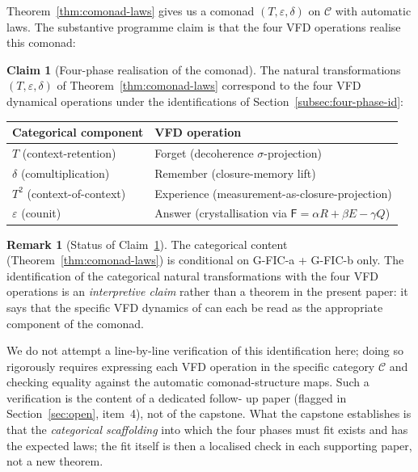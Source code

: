 \documentclass[11pt, a4paper]{amsart}
\theoremstyle{definition}
\newtheorem{remark}[theorem]{Remark}
\newtheorem{claim}[theorem]{Claim}
\newcommand{\catC}{\mathcal{C}}
\newcommand{\Fcrystal}{\mathsf{F}}
\begin{document}
Theorem~\ref{thm:comonad-laws} gives us a comonad $(T,
\varepsilon, \delta)$ on $\catC$ with automatic laws. The
substantive programme claim is that the four VFD operations
realise this comonad:

\begin{claim}[Four-phase realisation of the comonad]
\label{claim:four-phase-realisation}
The natural transformations
$(T, \varepsilon, \delta)$ of Theorem~\ref{thm:comonad-laws}
correspond to the four VFD dynamical operations under the
identifications of Section~\ref{subsec:four-phase-id}:
\begin{center}
\begin{tabular}{l|l}
Categorical component & VFD operation \\ \hline
$T$ (context-retention) & Forget (decoherence $\sigma$-projection) \\
$\delta$ (comultiplication) & Remember (closure-memory lift) \\
$T^2$ (context-of-context) & Experience (measurement-as-closure-projection) \\
$\varepsilon$ (counit) & Answer (crystallisation via
$\Fcrystal = \alpha R + \beta E - \gamma Q$) \\
\end{tabular}
\end{center}
\end{claim}

\begin{remark}[Status of Claim~\ref{claim:four-phase-realisation}]
\label{rmk:realisation-status}
The categorical content (Theorem~\ref{thm:comonad-laws}) is
conditional on G-FIC-a + G-FIC-b only. The identification of
the categorical natural transformations with the four VFD
operations is an \emph{interpretive claim} rather than a
theorem in the present paper: it says that the specific VFD
dynamics of \cite{PaperXXI, PaperXXXI, PaperXXXIII, PaperXLIV,
ACT-L1, VFDCrystallisation} can each be read as the appropriate
component of the comonad.

We do not attempt a line-by-line verification of this
identification here; doing so rigorously requires
expressing each VFD operation in the specific category $\catC$
and checking equality against the automatic comonad-structure
maps. Such a verification is the content of a dedicated follow-
up paper (flagged in Section~\ref{sec:open}, item~4), not of
the capstone. What the capstone establishes is that the
\emph{categorical scaffolding} into which the four phases must
fit exists and has the expected laws; the fit itself is then
a localised check in each supporting paper, not a new
theorem.
\end{remark}
\end{document}
